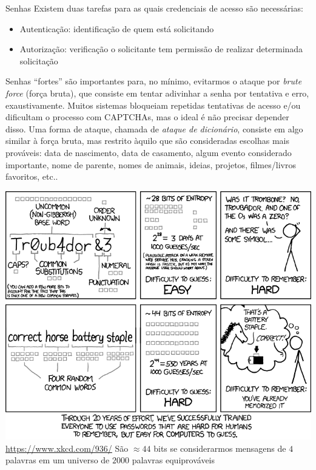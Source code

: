 \documentclass[utf8]{beamer}
\begin{document}
\begin{frame}{Senhas}
  Existem duas tarefas para as quais
  credenciais de acesso são necessárias:
  \begin{itemize}
    \item Autenticação: identificação de quem está solicitando
    \item Autorização: verificação o solicitante tem permissão
                       de realizar determinada solicitação
  \end{itemize}
  \vfill
  Senhas ``fortes'' são importantes para, no mínimo,
  evitarmos o ataque por \emph{brute force} (força bruta),
  que consiste em tentar adivinhar a senha por tentativa e erro,
  exaustivamente.
  Muitos sistemas bloqueiam repetidas tentativas de acesso
  e/ou dificultam o processo com CAPTCHAs,
  mas o ideal é não precisar depender disso.
  \vfill
  Uma forma de ataque, chamada de \emph{ataque de dicionário},
  consiste em algo similar à força bruta,
  mas restrito àquilo que são consideradas escolhas mais prováveis:
  data de nascimento, data de casamento,
  algum evento considerado importante, nome de parente,
  nomes de animais, ideias, projetos, filmes/livros favoritos, etc..
\end{frame}


\begin{frame}
  \centering
  \includegraphics[width=.8\textwidth]{password_strength.png}
  \url{https://www.xkcd.com/936/}
  \vfill
  São $\approx 44$ bits se considerarmos mensagens de $4$ palavras
   em um universo de $2000$ palavras equiprováveis
\end{frame}
\end{document}
